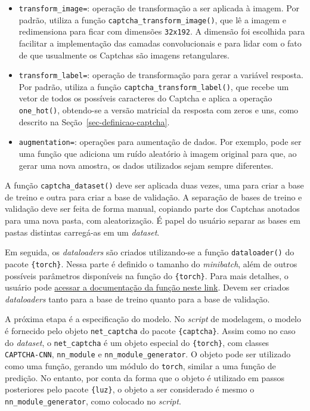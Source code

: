 \documentclass[12pt,twoside,brazilian]{book}
\providecommand{\tightlist}{%
  \setlength{\itemsep}{0pt}\setlength{\parskip}{0pt}}
\begin{document}
\begin{itemize}
\tightlist
\item
  \texttt{transform\_image=}: operação de transformação a ser aplicada à
  imagem. Por padrão, utiliza a função
  \texttt{captcha\_transform\_image()}, que lê a imagem e redimensiona
  para ficar com dimensões \texttt{32x192}. A dimensão foi escolhida
  para facilitar a implementação das camadas convolucionais e para lidar
  com o fato de que usualmente os Captchas são imagens retangulares.
\item
  \texttt{transform\_label=}: operação de transformação para gerar a
  variável resposta. Por padrão, utiliza a função
  \texttt{captcha\_transform\_label()}, que recebe um vetor de todos os
  possíveis caracteres do Captcha e aplica a operação
  \texttt{one\_hot()}, obtendo-se a versão matricial da resposta com
  zeros e uns, como descrito na Seção~\ref{sec-definicao-captcha}.
\item
  \texttt{augmentation=}: operações para aumentação de dados. Por
  exemplo, pode ser uma função que adiciona um ruído aleatório à imagem
  original para que, ao gerar uma nova amostra, os dados utilizados
  sejam sempre diferentes.
\end{itemize}

A função \texttt{captcha\_dataset()} deve ser aplicada duas vezes, uma
para criar a base de treino e outra para criar a base de validação. A
separação de bases de treino e validação deve ser feita de forma manual,
copiando parte dos Captchas anotados para uma nova pasta, com
aleatorização. É papel do usuário separar as bases em pastas distintas
carregá-as em um \emph{dataset}.

Em seguida, os \emph{dataloaders} são criados utilizando-se a função
\texttt{dataloader()} do pacote \texttt{\{torch\}}. Nessa parte é
definido o tamanho do \emph{minibatch}, além de outros possíveis
parâmetros disponíveis na função do \texttt{\{torch\}}. Para mais
detalhes, o usuário pode
\href{https://torch.mlverse.org/docs/reference/dataloader.html}{acessar
a documentação da função neste link}. Devem ser criados
\emph{dataloaders} tanto para a base de treino quanto para a base de
validação.

A próxima etapa é a especificação do modelo. No \emph{script} de
modelagem, o modelo é fornecido pelo objeto \texttt{net\_captcha} do
pacote \texttt{\{captcha\}}. Assim como no caso do \emph{dataset}, o
\texttt{net\_captcha} é um objeto especial do \texttt{\{torch\}}, com
classes \texttt{CAPTCHA-CNN}, \texttt{nn\_module} e
\texttt{nn\_module\_generator}. O objeto pode ser utilizado como uma
função, gerando um módulo do \texttt{torch}, similar a uma função de
predição. No entanto, por conta da forma que o objeto é utilizado em
passos posteriores pelo pacote \texttt{\{luz\}}, o objeto a ser
considerado é mesmo o \texttt{nn\_module\_generator}, como colocado no
\emph{script}.
\end{document}
